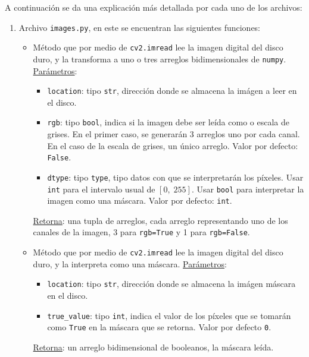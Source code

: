 A continuaci\'on se da una explicaci\'on m\'as detallada por cada uno de los archivos:
\begin{enumerate}
	\item Archivo \texttt{images.py}, en este se encuentran las siguientes funciones:
	\begin{itemize}
		\item {}
		
		M\'etodo que por medio de \texttt{cv2.imread} lee la imagen digital del disco duro, y la transforma a uno o tres arreglos bidimensionales de \texttt{numpy}. \underline{Par\'ametros}:
		\begin{itemize}
			\item \texttt{location}: tipo \texttt{str}, direcci\'on donde se almacena la im\'agen a leer en el disco.
			\item \texttt{rgb}: tipo \texttt{bool}, indica si la imagen debe ser le\'ida como \RGB o escala de grises. En el primer caso, se generar\'an 3 arreglos uno por cada canal. En el caso de la escala de grises, un \'unico arreglo. Valor por defecto: \texttt{False}.
			\item \texttt{dtype}: tipo \texttt{type}, tipo datos con que se interpretar\'an los p\'ixeles. Usar \texttt{int} para el intervalo usual de $[0,\; 255]$. Usar \texttt{bool} para interpretar la imagen como una m\'ascara. Valor por defecto: \texttt{int}.
		\end{itemize}
		\underline{Retorna}: una tupla de arreglos, cada arreglo representando uno de los canales de la imagen, 3 para \texttt{rgb=True} y 1 para \texttt{rgb=False}.
		
		\item {}
		
		 M\'etodo que por medio de \texttt{cv2.imread} lee la imagen digital del disco duro, y la interpreta como una m\'ascara. \underline{Par\'ametros}:
		\begin{itemize}
			\item \texttt{location}: tipo \texttt{str}, direcci\'on donde se almacena la im\'agen m\'ascara en el disco.
			\item \texttt{true\_value}: tipo \texttt{int}, indica el valor de los p\'ixeles que se tomar\'an como \texttt{True} en la m\'ascara que se retorna. Valor por defecto \texttt{0}.
		\end{itemize}
		\underline{Retorna}: un arreglo bidimensional de booleanos, la m\'ascara leída.
		

\end{itemize}
\end{enumerate}
